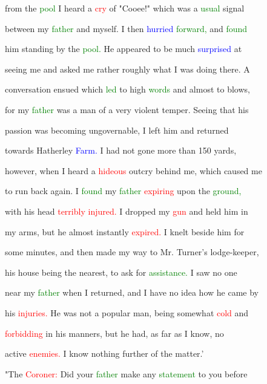  from the \textcolor{green}{pool} I heard a \textcolor{red}{cry} of "Cooee!" which was a \textcolor{green}{usual} signal

 between my \textcolor{green}{father} and myself. I then \textcolor{blue}{hurried} \textcolor{green}{forward,} and \textcolor{green}{found}

 him standing by the \textcolor{green}{pool.} He appeared to be much \textcolor{blue}{surprised} at

 seeing me and asked me rather roughly what I was doing there. A

 conversation ensued which \textcolor{green}{led} to high \textcolor{green}{words} and almost to blows,

 for my \textcolor{green}{father} was a man of a very \textcolor{BurntOrange}{violent} temper. Seeing that his

 \textcolor{BurntOrange}{passion} was becoming ungovernable, I left him and returned

 towards Hatherley \textcolor{blue}{Farm.} I had not gone more than 150 yards,

 however, when I heard a \textcolor{red}{hideous} \textcolor{BurntOrange}{outcry} behind me, which caused me

 to run back again. I \textcolor{green}{found} my \textcolor{green}{father} \textcolor{red}{expiring} upon the \textcolor{green}{ground,}

 with his head \textcolor{red}{terribly} \textcolor{red}{injured.} I dropped my \textcolor{red}{gun} and held him in

 my arms, but he almost instantly \textcolor{red}{expired.} I knelt beside him for

 some minutes, and then made my way to Mr. Turner's lodge-keeper,

 his house being the nearest, to ask for \textcolor{green}{assistance.} I saw no one

 near my \textcolor{green}{father} when I returned, and I have no idea how he came by

 his \textcolor{red}{injuries.} He was not a popular man, being somewhat \textcolor{red}{cold} and

 \textcolor{red}{forbidding} in his manners, but he had, as far as I know, no

 active \textcolor{red}{enemies.} I know nothing further of the matter.'



 "The \textcolor{red}{Coroner:} Did your \textcolor{green}{father} make any \textcolor{green}{statement} to you before


